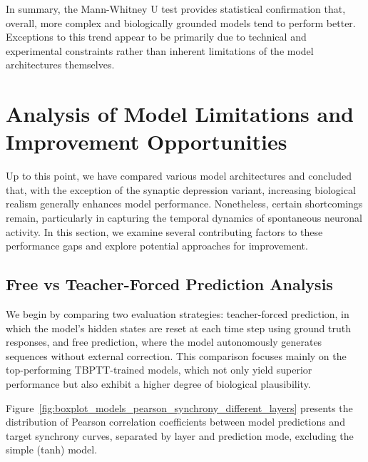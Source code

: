 In summary, the Mann-Whitney U test provides statistical confirmation that, overall, more complex and biologically grounded models tend to perform better. Exceptions to this trend appear to be primarily due to technical and experimental constraints rather than inherent limitations of the model architectures themselves.

\section{Analysis of Model Limitations and Improvement Opportunities}
\label{sec:performace_gaps_and_opportunities_for_improvement}

Up to this point, we have compared various model architectures and concluded that, with the exception of the synaptic depression variant, increasing biological realism generally enhances model performance. Nonetheless, certain shortcomings remain, particularly in capturing the temporal dynamics of spontaneous neuronal activity. In this section, we examine several contributing factors to these performance gaps and explore potential approaches for improvement.

\subsection{Free vs Teacher-Forced Prediction Analysis}
\label{{subsec:free_vs_teacher_forced_predictions}}

We begin by comparing two evaluation strategies: teacher-forced prediction, in which the model's hidden states are reset at each time step using ground truth responses, and free prediction, where the model autonomously generates sequences without external correction. This comparison focuses mainly on the top-performing TBPTT-trained models, which not only yield superior performance but also exhibit a higher degree of biological plausibility.

Figure~\ref{fig:boxplot_models_pearson_synchrony_different_layers} presents the distribution of Pearson correlation coefficients between model predictions and target synchrony curves, separated by layer and prediction mode, excluding the simple (tanh) model.

